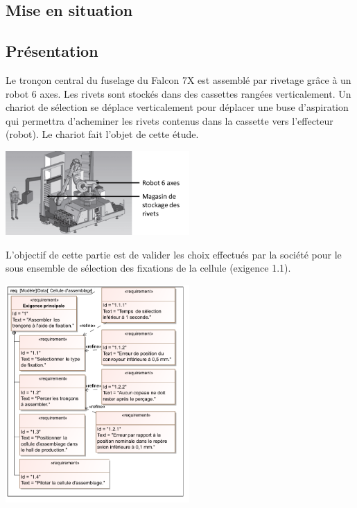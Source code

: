 \documentclass[10pt,fleqn]{article} %
\begin{document}

\vspace{5cm}
\pagestyle{fancy}
\thispagestyle{plain}

\setlength{\columnseprule}{0.4pt}
\begin{multicols}{2}
\section*{Mise en situation}
\subsection*{Présentation}
Le tronçon central du fuselage du Falcon 7X est assemblé par rivetage grâce à un robot 6 axes. Les rivets sont stockés dans des cassettes rangées verticalement. Un chariot de sélection se déplace verticalement pour déplacer une buse d'aspiration qui permettra d'acheminer les rivets contenus dans la cassette vers l'effecteur (robot). Le chariot fait l'objet de cette étude.

\begin{center}
\includegraphics[width=7cm]{images/image5}
\end{center} 

 
L'objectif de cette partie est de valider les choix effectués par la société pour le sous ensemble de sélection des fixations de la cellule (exigence 1.1).

\vfill

\begin{center}
\includegraphics[width=7cm]{images/Exigences}
\end{center} 





\end{multicols}
\end{document}
